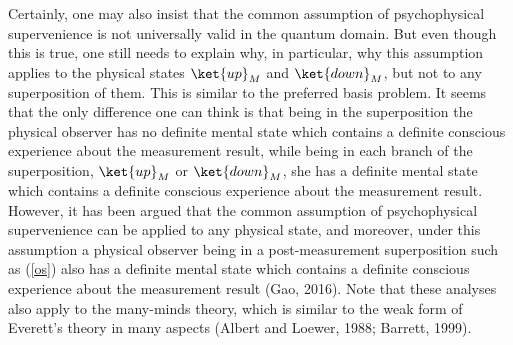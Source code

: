 Certainly, one may also insist that the common assumption of psychophysical supervenience is not universally valid in the quantum domain. %
But even though this is true, one still needs to explain why, in particular, why this assumption applies to the physical states  $\ket{up}_M$ and $\ket{down}_M$, but not to any superposition of them. This is similar to the preferred basis problem.
It seems that the only difference one can think is that being in the superposition the physical observer has no definite mental state which contains a definite conscious experience about the measurement result, while being in each branch of the superposition, $\ket{up}_M$ or $\ket{down}_M$, she has a definite mental state which contains a definite conscious experience about the measurement result.
However, it has been argued that the common assumption of psychophysical supervenience can be applied to any physical state, and moreover, under this assumption a physical observer being in a post-measurement superposition such as (\ref{os}) also has a definite mental state which contains a definite conscious experience about the measurement result (Gao, 2016).
Note that these analyses also apply to the many-minds theory, which is similar to the weak form of Everett's theory in many aspects (Albert and Loewer, 1988; Barrett, 1999).



